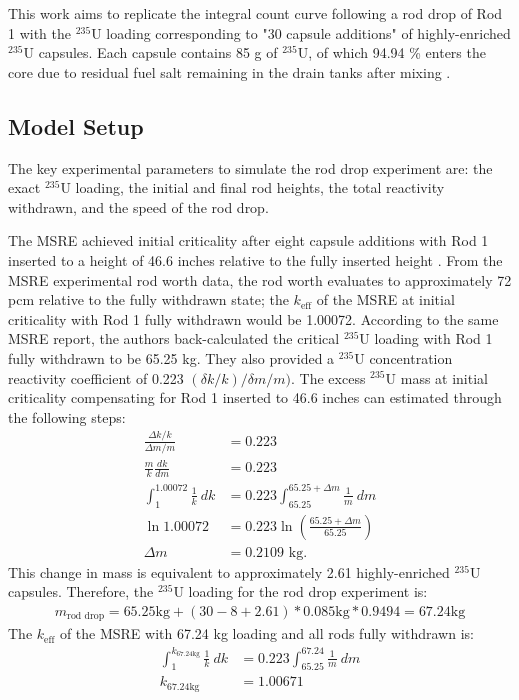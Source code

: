 This work aims to replicate the integral count curve following a rod
drop of Rod 1 with the $^{235}$U loading corresponding to "30 capsule additions" of highly-enriched
$^{235}$U capsules. Each capsule contains 85 g of $^{235}$U, of which 94.94 \% enters the core due
to residual fuel salt remaining in the drain tanks after mixing \cite{fratoni_molten_2020}.

\subsection{Model Setup} \label{sec:rod-drop-setup}

The key experimental parameters to simulate the rod drop experiment are: the exact $^{235}$U
loading, the initial and final rod heights, the total reactivity withdrawn, and the speed of the
rod drop.

The \gls{MSRE} achieved initial criticality after eight capsule additions with Rod 1 inserted to a
height of 46.6 inches relative to the fully inserted height \cite{prince_zero-power_1968}.
From the \gls{MSRE} experimental rod worth
data, the rod worth evaluates to approximately 72 pcm relative to the fully withdrawn state; the
$k_\text{eff}$ of the \gls{MSRE} at initial criticality with Rod 1 fully withdrawn would be
1.00072. According to the same \gls{MSRE} report, the
authors back-calculated the critical $^{235}$U loading with Rod 1 fully withdrawn to be 65.25 kg.
They also provided a $^{235}$U concentration reactivity coefficient of 0.223 $(\delta k/k)/\delta m
/m)$. The excess $^{235}$U mass at initial criticality compensating for Rod 1 inserted to 46.6
inches can estimated through the following steps:
%
\begin{align}
  \frac{\Delta k / k}{\Delta m / m} &= 0.223 \nonumber \\
  \frac{m}{k}\frac{dk}{dm} &= 0.223 \nonumber \\
  \int^{1.00072}_1 \frac{1}{k}\ dk &= 0.223 \int^{65.25+\Delta m}_{65.25} \frac{1}{m}\ dm \nonumber \\
  \ln 1.00072 &= 0.223 \ln\left(\frac{65.25+\Delta m}{65.25}\right) \nonumber \\
  \Delta m &= 0.2109 \mbox{ kg}.
\end{align}
%
This change in mass is equivalent to approximately 2.61 highly-enriched $^{235}$U capsules.
Therefore, the $^{235}$U loading for the rod drop experiment is:
%
\begin{gather}
  m_\text{rod drop} = 65.25 \text{kg} + (30 - 8 + 2.61) * 0.085 \text{kg} * 0.9494 = 67.24 \text{kg}
\end{gather}
%
The $k_\text{eff}$ of the \gls{MSRE} with 67.24 kg loading and all rods fully withdrawn is:
%
\begin{align}
  \int^{k_{67.24 \text{kg}}}_1 \frac{1}{k}\ dk &= 0.223 \int^{67.24}_{65.25} \frac{1}{m}\ dm \nonumber \\
    k_{67.24 \text{kg}} &= 1.00671
\end{align}

